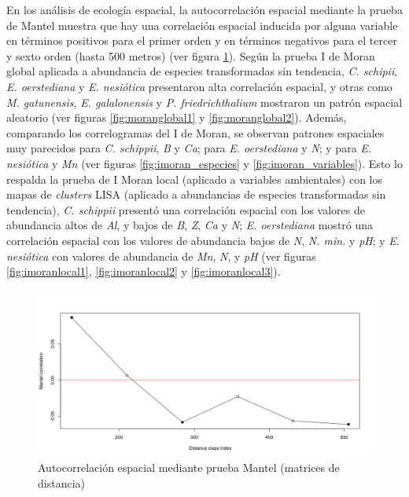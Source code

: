 \documentclass[11pt,]{article}
\begin{document}
En los análisis de ecología espacial, la autocorrelación espacial
mediante la prueba de Mantel muestra que hay una correlación espacial
inducida por alguna variable en términos positivos para el primer orden
y en términos negativos para el tercer y sexto orden (hasta 500 metros)
(ver figura \ref{fig:prueba_mantel}). Según la prueba I de Moran global
aplicada a abundancia de especies transformadas sin tendencia, \emph{C.
schipii}, \emph{E. oerstediana} y \emph{E. nesiótica} presentaron alta
correlación espacial, y otras como \emph{M. gatunensis}, \emph{E.
galalonensis} y \emph{P. friedrichthalium} mostraron un patrón espacial
aleatorio (ver figuras \ref{fig:moranglobal1} y \ref{fig:moranglobal2}).
Además, comparando los correlogramas del I de Moran, se observan
patrones espaciales muy parecidos para \emph{C. schippii}, \emph{B} y
\emph{Ca}; para \emph{E. oerstediana} y \emph{N}; y para \emph{E.
nesiótica} y \emph{Mn} (ver figuras \ref{fig:imoran_especies} y
\ref{fig:imoran_variables}). Esto lo respalda la prueba de I Moran local
(aplicado a variables ambientales) con los mapas de \emph{clusters} LISA
(aplicado a abundancias de especies transformadas sin tendencia),
\emph{C. schippii} presentó una correlación espacial con los valores de
abundancia altos de \emph{Al}, y bajos de \emph{B}, \emph{Z}, \emph{Ca}
y \emph{N}; \emph{E. oerstediana} mostró una correlación espacial con
los valores de abundancia bajos de \emph{N}, \emph{N. min.} y \emph{pH};
y \emph{E. nesiótica} con valores de abundancia de \emph{Mn}, \emph{N},
y \emph{pH} (ver figuras \ref{fig:imoranlocal1}, \ref{fig:imoranlocal2}
y \ref{fig:imoranlocal3}).

\begin{figure}
\centering
\includegraphics{prueba_mantel.png}
\caption{Autocorrelación espacial mediante prueba Mantel (matrices de
distancia) \label{fig:prueba_mantel}}
\end{figure}
\end{document}
